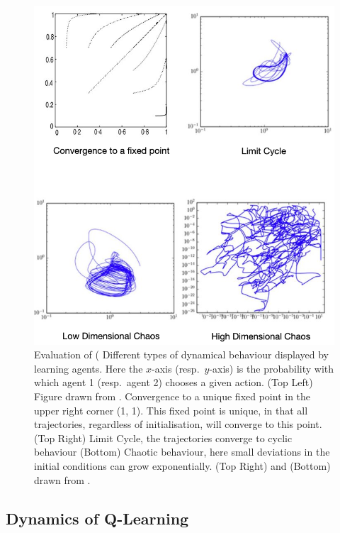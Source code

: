 \documentclass[sigconf,anonymous]{aamas}
\begin{document}
    \begin{figure}[t]
    \centering
    \includegraphics[width = \linewidth]{Figures/DynamicalBehaviours.png}
    \caption{Evaluation of (\label{fig::DynamicalBehaviours} Different types of dynamical behaviour
       displayed
        by learning agents. Here the $x$-axis (resp.~$y$-axis) is the probability with which agent 1 (resp.~agent 2) chooses a given action. (Top Left) Figure drawn from \cite{Tuyls2006AnGames}.
        Convergence
        to a unique fixed point in the upper right corner (1, 1). This fixed point is unique, in
        that all trajectories, regardless of initialisation, will converge to this point. (Top Right) Limit Cycle, the trajectories converge to cyclic behaviour (Bottom)
        Chaotic behaviour, here small deviations in the initial conditions can grow
        exponentially. (Top Right) and (Bottom) drawn from \cite{Sanders2018}.}
\end{figure}

\subsection{Dynamics of Q-Learning}
\end{document}
